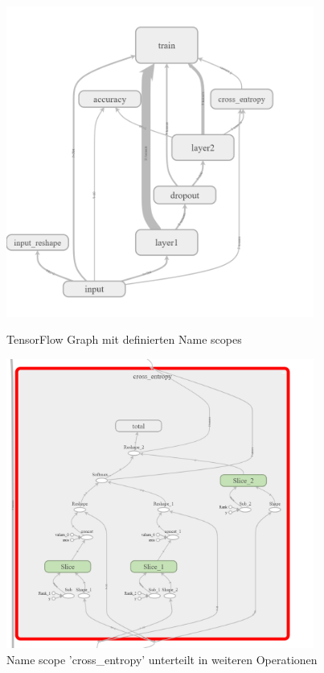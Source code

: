 \begin{figure}[t]
\begin{minipage}[t]{0.475\textwidth}
\centering
\includegraphics[width=0.9\textwidth]{images/Kapitel_3/graph.png}
\caption{TensorFlow Graph mit definierten Name scopes}
\label{fig:TensorFlow_Graph}
\end{minipage}
\hfill
\begin{minipage}[t]{0.475\textwidth}
\centering
\includegraphics[width=0.9\textwidth]{images/Kapitel_3/graph1.png}
\caption{Name scope 'cross\_entropy' unterteilt in weiteren Operationen}
\label{fig:name_scope_cross_entropy}
\end{minipage}
\end{figure}



